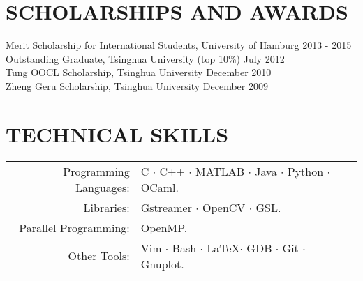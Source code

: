 \documentclass[a4paper,11pt]{article} %
\begin{document}
\section{SCHOLARSHIPS AND AWARDS}

Merit Scholarship for International Students, University of Hamburg \hfill 2013 - 2015 \\
Outstanding Graduate, Tsinghua University (top 10\%) \hfill July 2012 \\
Tung OOCL Scholarship, Tsinghua University \hfill December 2010  \\
Zheng Geru Scholarship, Tsinghua University \hfill December 2009


\section{TECHNICAL SKILLS}

\begin{tabular}{rl}
  Programming Languages: & C $\cdotp$ C++ $\cdotp$ MATLAB $\cdotp$ Java $\cdotp$ Python $\cdotp$ OCaml. \\
  Libraries: & Gstreamer $\cdotp$ OpenCV $\cdotp$ GSL. \\
  Parallel Programming: & OpenMP. \\
  Other Tools: & Vim $\cdotp$ Bash $\cdotp$ \LaTeX $\cdotp$ GDB $\cdotp$ Git $\cdotp$ Gnuplot. \\
\end{tabular}

\end{document}
